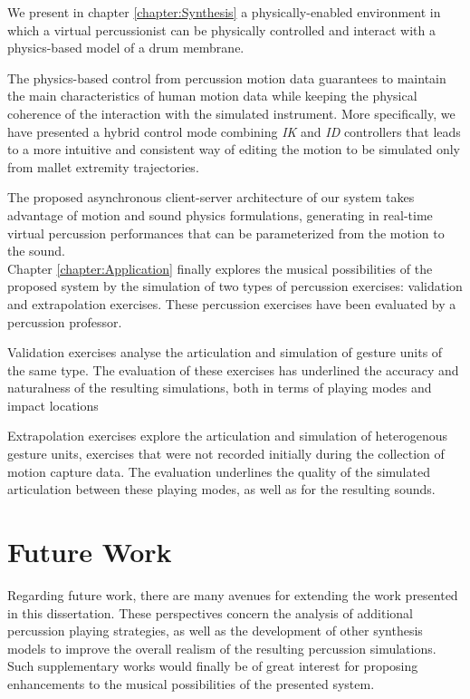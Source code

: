We present in chapter \ref{chapter:Synthesis} a physically-enabled environment in which a virtual percussionist can be physically controlled and interact with a physics-based model of a drum membrane.

The physics-based control from percussion motion data guarantees to maintain the main characteristics of human motion data while keeping the physical coherence of the interaction with the simulated instrument. More specifically, we have presented a hybrid control mode combining \emph{IK} and \emph{ID} controllers that leads to a more intuitive and consistent way of editing the motion to be simulated only from mallet extremity trajectories.

The proposed asynchronous client-server architecture of our system takes advantage of motion and sound physics formulations, generating in real-time virtual percussion performances that can be parameterized from the motion to the sound.\\

Chapter \ref{chapter:Application} finally explores the musical possibilities of the proposed system by the simulation of two types of percussion exercises: validation and extrapolation exercises. These percussion exercises have been evaluated by a percussion professor.

Validation exercises analyse the articulation and simulation of gesture units of the same type. The evaluation of these exercises has underlined the accuracy and naturalness of the resulting simulations, both in terms of playing modes and impact locations

Extrapolation exercises explore the articulation and simulation of heterogenous gesture units, exercises that were not recorded initially during the collection of motion capture data. The evaluation underlines the quality of the simulated articulation between these playing modes, as well as for the resulting sounds.




	\section{Future Work}
	\label{sec:Conclusion_FutureWork}

Regarding future work, there are many avenues for extending the work presented in this dissertation. These perspectives concern the analysis of additional percussion playing strategies, as well as the development of other synthesis models to improve the overall realism of the resulting percussion simulations. Such supplementary works would finally be of great interest for proposing enhancements to the musical possibilities of the presented system.


